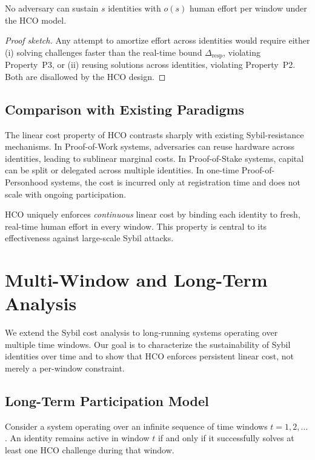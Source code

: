 \documentclass[sigconf,nonacm]{acmart}
\begin{document}
\begin{corollary}
	No adversary can sustain $s$ identities with $o(s)$ human effort per window under the HCO model.
\end{corollary}

\begin{proof}[Proof sketch]
	Any attempt to amortize effort across identities would require either (i) solving challenges faster than the real-time bound $\Delta_{\mathrm{resp}}$, violating Property~P3, or (ii) reusing solutions across identities, violating Property~P2. Both are disallowed by the HCO design.
\end{proof}

\subsection{Comparison with Existing Paradigms}

The linear cost property of HCO contrasts sharply with existing Sybil-resistance mechanisms. In Proof-of-Work systems, adversaries can reuse hardware across identities, leading to sublinear marginal costs. In Proof-of-Stake systems, capital can be split or delegated across multiple identities. In one-time Proof-of-Personhood systems, the cost is incurred only at registration time and does not scale with ongoing participation.

HCO uniquely enforces \emph{continuous} linear cost by binding each identity to fresh, real-time human effort in every window. This property is central to its effectiveness against large-scale Sybil attacks.

\section{Multi-Window and Long-Term Analysis}

We extend the Sybil cost analysis to long-running systems operating over multiple time windows. Our goal is to characterize the sustainability of Sybil identities over time and to show that HCO enforces persistent linear cost, not merely a per-window constraint.

\subsection{Long-Term Participation Model}

Consider a system operating over an infinite sequence of time windows $t = 1, 2, \dots$. An identity remains active in window $t$ if and only if it successfully solves at least one HCO challenge during that window.
\end{document}
